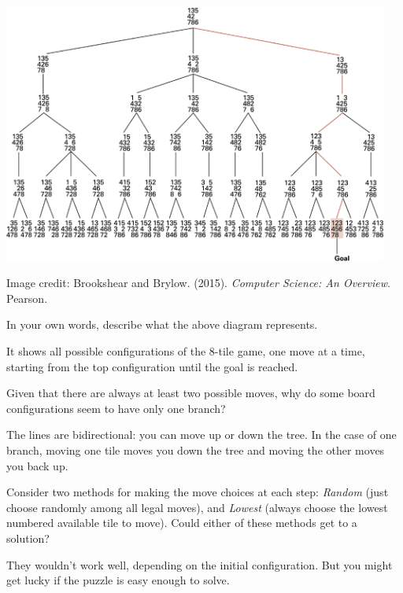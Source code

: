 
\begin{center}
\includegraphics[width=0.95\textwidth]{search-tree1.png}
\end{center}

\begin{center}
\color{gray}\scriptsize Image credit:
Brookshear and Brylow. (2015). \textit{Computer Science: An Overview}. Pearson.
\end{center}




\Q In your own words, describe what the above diagram represents.

\begin{answer}
It shows all possible configurations of the 8-tile game, one move at a time, starting from the top configuration until the goal is reached.
\end{answer}


\Q Given that there are always at least two possible moves, why do some board configurations seem to have only one branch?

\begin{answer}
The lines are bidirectional: you can move up or down the tree.
In the case of one branch, moving one tile moves you down the tree and moving the other moves you back up.
\end{answer}


\Q \label{guess} Consider two methods for making the move choices at each step:
\emph{Random} (just choose randomly among all legal moves), and
\emph{Lowest} (always choose the lowest numbered available tile to move).
Could either of these methods get to a solution?

\begin{answer}
They wouldn't work well, depending on the initial configuration.
But you might get lucky if the puzzle is easy enough to solve.
\end{answer}


